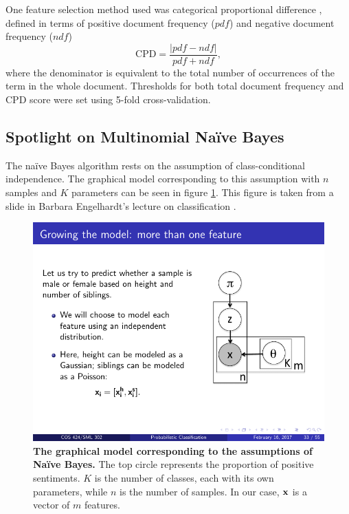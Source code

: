 \documentclass{article} %
\begin{document}
	One feature selection method used was categorical proportional difference \cite{oKeefe2009}, defined in terms of positive document frequency ($pdf$) and negative document frequency ($ndf$)
	\begin{equation}
	\mbox{CPD} = \frac{|pdf - ndf|}{pdf + ndf},
	\end{equation}
	where the denominator is equivalent to the total number of occurrences of the term in the whole document. Thresholds for both total document frequency and CPD score were set using 5-fold cross-validation.
	
	\subsection{Spotlight on Multinomial Na\"ive Bayes} \label{subs:mnb}
	
	The na\"ive Bayes algorithm rests on the assumption of class-conditional independence. The graphical model corresponding to this assumption with $n$ samples and $K$ parameters can be seen in figure \ref{fig:dag}. This figure is taken from a slide in Barbara Engelhardt's lecture on classification \cite{engelhardt17}.
	
	\begin{figure}[h]
		\centering
		\includegraphics[scale=1]{DAG}
		\caption{{\bf The graphical model corresponding to the assumptions of Na\"ive Bayes.} The top circle represents the proportion of positive sentiments. $K$ is the number of classes, each with its own parameters, while $n$ is the number of samples. In our case, $\bf x$ is a vector of $m$ features.}
		\label{fig:dag}
	\end{figure}
	
\end{document}
